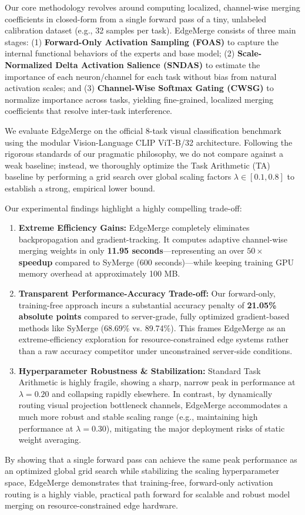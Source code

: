 Our core methodology revolves around computing localized, channel-wise merging coefficients in closed-form from a single forward pass of a tiny, unlabeled calibration dataset (e.g., 32 samples per task). EdgeMerge consists of three main stages: (1) \textbf{Forward-Only Activation Sampling (FOAS)} to capture the internal functional behaviors of the experts and base model; (2) \textbf{Scale-Normalized Delta Activation Salience (SNDAS)} to estimate the importance of each neuron/channel for each task without bias from natural activation scales; and (3) \textbf{Channel-Wise Softmax Gating (CWSG)} to normalize importance across tasks, yielding fine-grained, localized merging coefficients that resolve inter-task interference.

We evaluate EdgeMerge on the official 8-task visual classification benchmark using the modular Vision-Language CLIP ViT-B/32 architecture. Following the rigorous standards of our pragmatic philosophy, we do not compare against a weak baseline; instead, we thoroughly optimize the Task Arithmetic (TA) baseline by performing a grid search over global scaling factors $\lambda \in [0.1, 0.8]$ to establish a strong, empirical lower bound.

Our experimental findings highlight a highly compelling trade-off:
\begin{enumerate}
    \item \textbf{Extreme Efficiency Gains:} EdgeMerge completely eliminates backpropagation and gradient-tracking. It computes adaptive channel-wise merging weights in only \textbf{11.95 seconds}---representing an over \textbf{$50\times$ speedup} compared to SyMerge (600 seconds)---while keeping training GPU memory overhead at approximately 100 MB.
    \item \textbf{Transparent Performance-Accuracy Trade-off:} Our forward-only, training-free approach incurs a substantial accuracy penalty of \textbf{21.05\% absolute points} compared to server-grade, fully optimized gradient-based methods like SyMerge (68.69\% vs. 89.74\%). This frames EdgeMerge as an extreme-efficiency exploration for resource-constrained edge systems rather than a raw accuracy competitor under unconstrained server-side conditions.
    \item \textbf{Hyperparameter Robustness \& Stabilization:} Standard Task Arithmetic is highly fragile, showing a sharp, narrow peak in performance at $\lambda = 0.20$ and collapsing rapidly elsewhere. In contrast, by dynamically routing visual projection bottleneck channels, EdgeMerge accommodates a much more robust and stable scaling range (e.g., maintaining high performance at $\lambda = 0.30$), mitigating the major deployment risks of static weight averaging.
\end{enumerate}

By showing that a single forward pass can achieve the same peak performance as an optimized global grid search while stabilizing the scaling hyperparameter space, EdgeMerge demonstrates that training-free, forward-only activation routing is a highly viable, practical path forward for scalable and robust model merging on resource-constrained edge hardware.
